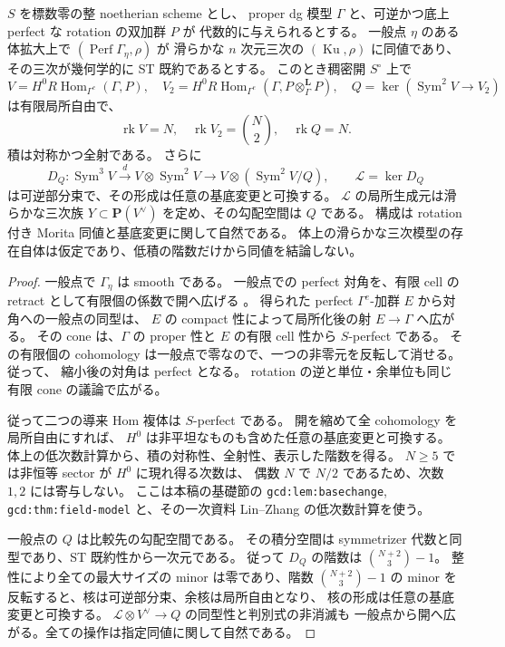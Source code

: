 \begin{theorem}[稠密開上の正準的な残余三次]
\label{thm:nfm-relative-residual-cubic}
$S$ を標数零の整 noetherian scheme とし、
proper dg 模型 $\Gamma$ と、可逆かつ底上 perfect な rotation の双加群 $P$ が
代数的に与えられるとする。
一般点 $\eta$ のある体拡大上で
$(\operatorname{Perf}\Gamma_\eta,\rho)$ が
滑らかな $n$ 次元三次の $(\operatorname{Ku},\rho)$ に同値であり、
その三次が幾何学的に ST 既約であるとする。
このとき稠密開 $S^\circ$ 上で
\[
 V=H^0R\operatorname{Hom}_{\Gamma^e}(\Gamma,P),\quad
 V_2=H^0R\operatorname{Hom}_{\Gamma^e}
       (\Gamma,P\otimes_\Gamma^{\mathbf L}P),\quad
 Q=\ker(\operatorname{Sym}^2V\longrightarrow V_2)
\]
は有限局所自由で、
\[
 \operatorname{rk}V=N,\quad \operatorname{rk}V_2=\binom N2,\quad
 \operatorname{rk}Q=N .
\]
積は対称かつ全射である。
さらに
\[
 D_Q:\operatorname{Sym}^3V
 \xrightarrow{d}V\otimes\operatorname{Sym}^2V
 \longrightarrow V\otimes(\operatorname{Sym}^2V/Q),\qquad
 \mathcal L=\ker D_Q
\]
は可逆部分束で、その形成は任意の基底変更と可換する。
$\mathcal L$ の局所生成元は滑らかな三次族
$Y\subset\mathbf P(V^\vee)$ を定め、その勾配空間は $Q$ である。
構成は rotation 付き Morita 同値と基底変更に関して自然である。
体上の滑らかな三次模型の存在自体は仮定であり、低積の階数だけから同値を結論しない。
\end{theorem}

\begin{proof}
一般点で $\Gamma_\eta$ は smooth である。
一般点での perfect 対角を、有限 cell の retract として有限個の係数で開へ広げる
\cite[Lemma~2.10]{NFMToenVaquieModuli}。
得られた perfect $\Gamma^e$-加群 $E$ から対角への一般点の同型は、
$E$ の compact 性によって局所化後の射 $E\to\Gamma$ へ広がる。
その cone は、$\Gamma$ の proper 性と $E$ の有限 cell 性から $S$-perfect である。
その有限個の cohomology は一般点で零なので、一つの非零元を反転して消せる。従って、
縮小後の対角は perfect となる。
rotation の逆と単位・余単位も同じ有限 cone の議論で広がる。

従って二つの導来 Hom 複体は $S$-perfect である。
開を縮めて全 cohomology を局所自由にすれば、
$H^0$ は非平坦なものも含めた任意の基底変更と可換する。
体上の低次数計算から、積の対称性、全射性、表示した階数を得る。
$N\ge5$ では非恒等 sector が $H^0$ に現れ得る次数は、
偶数 $N$ で $N/2$ であるため、次数 $1,2$ には寄与しない。
ここは本稿の基礎節の \texttt{gcd:lem:basechange},
\texttt{gcd:thm:field-model} と、その一次資料 Lin--Zhang の低次数計算を使う。

一般点の $Q$ は比較先の勾配空間である。
その積分空間は symmetrizer 代数と同型であり、ST 既約性から一次元である。
従って $D_Q$ の階数は $\binom{N+2}{3}-1$。
整性により全ての最大サイズの minor は零であり、階数 $\binom{N+2}{3}-1$ の minor を反転すると、核は可逆部分束、余核は局所自由となり、
核の形成は任意の基底変更と可換する。
$\mathcal L\otimes V^\vee\to Q$ の同型性と判別式の非消滅も
一般点から開へ広がる。全ての操作は指定同値に関して自然である。
\end{proof}

